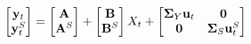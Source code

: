 \begin{equation} \label{eq:nYaffineYS}
	\begin{bmatrix}
		\mathbf{y}_{t} \\ 
		\mathbf{y}_{t}^{S}
	\end{bmatrix} 
	= 
	\begin{bmatrix}
		\mathbf{A} \\
		\mathbf{A}^{S}
	\end{bmatrix} 
	+
	\begin{bmatrix}
		\mathbf{B} \\
		\mathbf{B}^{S}  
	\end{bmatrix} 
	X_{t}
	+
	\begin{bmatrix}
		\mathbf{\mathbf{\Sigma}}_{Y} \mathbf{u}_{t} & \mathbf{0} \\
		\mathbf{0}     & \mathbf{\mathbf{\Sigma}}_{S} \mathbf{u}_{t}^{S}
	\end{bmatrix} 
\end{equation}

